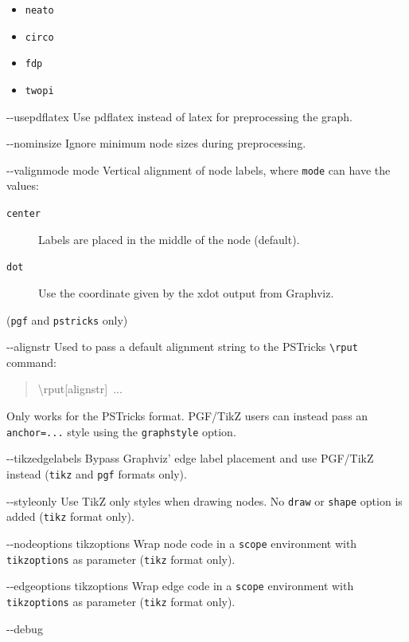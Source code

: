 \documentclass[10pt,a4paper,english]{article}
\newcommand{\optionlistlabel}[1]{\bf #1 \hfill}
\newenvironment{optionlist}[1]
{\begin{list}{}
  {\setlength{\labelwidth}{#1}
   \setlength{\rightmargin}{1cm}
   \setlength{\leftmargin}{\rightmargin}
   \addtolength{\leftmargin}{\labelwidth}
   \addtolength{\leftmargin}{\labelsep}
   \renewcommand{\makelabel}{\optionlistlabel}}
}{\end{list}}
\begin{document}
\begin{optionlist}{3cm}
\begin{itemize}
\item {} 
\texttt{neato}

\item {} 
\texttt{circo}

\item {} 
\texttt{fdp}

\item {} 
\texttt{twopi}

\end{itemize}
\item [-{}-usepdflatex]  
Use pdflatex instead of latex for preprocessing the graph.
\item [-{}-nominsize]  
Ignore minimum node sizes during preprocessing.
\item [-{}-valignmode mode]  
Vertical alignment of node labels, where \texttt{mode} can have the values:
\begin{description}
\item[{\texttt{center}}] \leavevmode 
Labels are placed in the middle of the node (default).

\item[{\texttt{dot}}] \leavevmode 
Use the coordinate given by the xdot output from Graphviz.

\end{description}

(\texttt{pgf} and \texttt{pstricks} only)
\item [-{}-alignstr]  
Used to pass a default alignment string to the PSTricks \texttt{{\textbackslash}rput} command:
\begin{quote}{\ttfamily \raggedright \noindent
{\textbackslash}rput{[}alignstr{]}~...
}\end{quote}

Only works for the PSTricks format. PGF/TikZ users can instead pass an \texttt{anchor=...} style using the \texttt{graphstyle} option.
\item [-{}-tikzedgelabels]  
Bypass Graphviz' edge label placement and use PGF/TikZ instead (\texttt{tikz} and \texttt{pgf} formats only).
\item [-{}-styleonly]  
Use TikZ only styles when drawing nodes. No \texttt{draw} or \texttt{shape} option is added (\texttt{tikz} format only).
\item [-{}-nodeoptions tikzoptions]  
Wrap node code in a \texttt{scope} environment with \texttt{tikzoptions} as parameter (\texttt{tikz} format only).
\item [-{}-edgeoptions tikzoptions]  
Wrap edge code in a \texttt{scope} environment with \texttt{tikzoptions} as parameter (\texttt{tikz} format only).
\item [-{}-debug]  
\end{optionlist}
\end{document}
